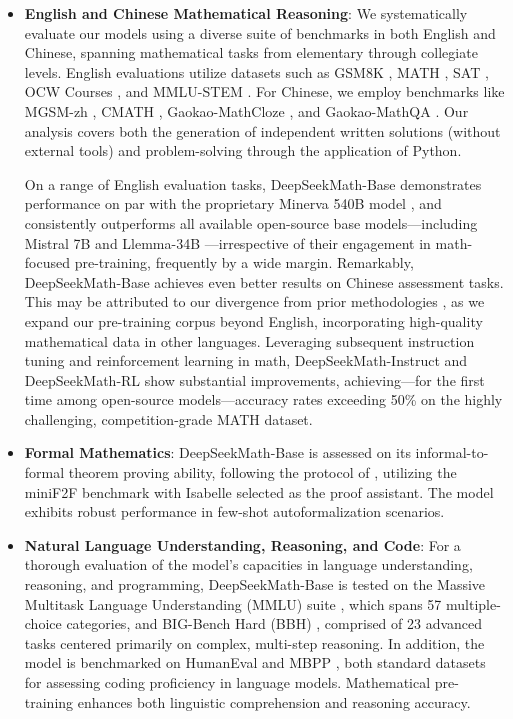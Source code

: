 \begin{itemize}[topsep=0pt]
    \item \textbf{English and Chinese Mathematical Reasoning}: We systematically evaluate our models using a diverse suite of benchmarks in both English and Chinese, spanning mathematical tasks from elementary through collegiate levels. English evaluations utilize datasets such as GSM8K \citep{gsm8k}, MATH \citep{MATH}, SAT \citep{llemma}, OCW Courses \citep{minerva}, and MMLU-STEM \citep{mmlu}. For Chinese, we employ benchmarks like MGSM-zh \citep{mgsm}, CMATH \citep{wei2023cmath}, Gaokao-MathCloze \citep{agieval}, and Gaokao-MathQA \citep{agieval}. Our analysis covers both the generation of independent written solutions (without external tools) and problem-solving through the application of Python.

On a range of English evaluation tasks, DeepSeekMath-Base demonstrates performance on par with the proprietary Minerva 540B model \citep{minerva}, and consistently outperforms all available open-source base models—including Mistral 7B \citep{mistral} and Llemma-34B \citep{llemma}—irrespective of their engagement in math-focused pre-training, frequently by a wide margin. Remarkably, DeepSeekMath-Base achieves even better results on Chinese assessment tasks. This may be attributed to our divergence from prior methodologies \citep{minerva,llemma}, as we expand our pre-training corpus beyond English, incorporating high-quality mathematical data in other languages. Leveraging subsequent instruction tuning and reinforcement learning in math, DeepSeekMath-Instruct and DeepSeekMath-RL show substantial improvements, achieving—for the first time among open-source models—accuracy rates exceeding 50\% on the highly challenging, competition-grade MATH dataset.

\item \textbf{Formal Mathematics}: DeepSeekMath-Base is assessed on its informal-to-formal theorem proving ability, following the protocol of \citep{dsp_proof}, utilizing the miniF2F benchmark \citep{minif2f} with Isabelle \citep{isabelle} selected as the proof assistant. The model exhibits robust performance in few-shot autoformalization scenarios.
\item \textbf{Natural Language Understanding, Reasoning, and Code}: For a thorough evaluation of the model's capacities in language understanding, reasoning, and programming, DeepSeekMath-Base is tested on the Massive Multitask Language Understanding (MMLU) suite \citep{mmlu}, which spans 57 multiple-choice categories, and BIG-Bench Hard (BBH) \citep{bbh}, comprised of 23 advanced tasks centered primarily on complex, multi-step reasoning. In addition, the model is benchmarked on HumanEval \citep{codex} and MBPP \citep{mbpp}, both standard datasets for assessing coding proficiency in language models. Mathematical pre-training enhances both linguistic comprehension and reasoning accuracy.


\end{itemize}
